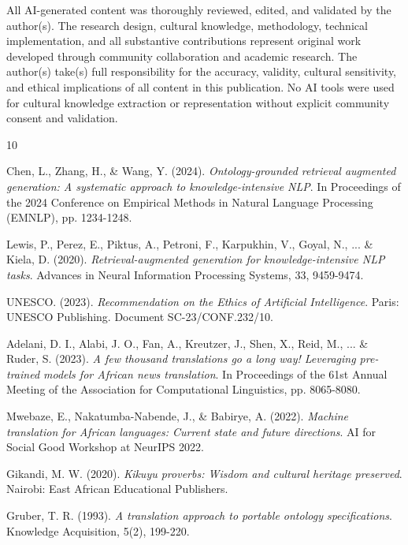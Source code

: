 \documentclass[
]{ceurart}
\begin{document}
\noindent All AI-generated content was thoroughly reviewed, edited, and validated by the author(s). The research design, cultural knowledge, methodology, technical implementation, and all substantive contributions represent original work developed through community collaboration and academic research. The author(s) take(s) full responsibility for the accuracy, validity, cultural sensitivity, and ethical implications of all content in this publication. No AI tools were used for cultural knowledge extraction or representation without explicit community consent and validation.

\begin{thebibliography}{10}

Chen, L., Zhang, H., \& Wang, Y. (2024).
\textit{Ontology-grounded retrieval augmented generation: A systematic approach to knowledge-intensive NLP}.
In Proceedings of the 2024 Conference on Empirical Methods in Natural Language Processing (EMNLP), pp. 1234-1248.

Lewis, P., Perez, E., Piktus, A., Petroni, F., Karpukhin, V., Goyal, N., ... \& Kiela, D. (2020).
\textit{Retrieval-augmented generation for knowledge-intensive NLP tasks}.
Advances in Neural Information Processing Systems, 33, 9459-9474.

UNESCO. (2023).
\textit{Recommendation on the Ethics of Artificial Intelligence}.
Paris: UNESCO Publishing. Document SC-23/CONF.232/10.

Adelani, D. I., Alabi, J. O., Fan, A., Kreutzer, J., Shen, X., Reid, M., ... \& Ruder, S. (2023).
\textit{A few thousand translations go a long way! Leveraging pre-trained models for African news translation}.
In Proceedings of the 61st Annual Meeting of the Association for Computational Linguistics, pp. 8065-8080.

Mwebaze, E., Nakatumba-Nabende, J., \& Babirye, A. (2022).
\textit{Machine translation for African languages: Current state and future directions}.
AI for Social Good Workshop at NeurIPS 2022.

Gikandi, M. W. (2020).
\textit{Kikuyu proverbs: Wisdom and cultural heritage preserved}.
Nairobi: East African Educational Publishers.

Gruber, T. R. (1993).
\textit{A translation approach to portable ontology specifications}.
Knowledge Acquisition, 5(2), 199-220.


\end{thebibliography}
\end{document}
